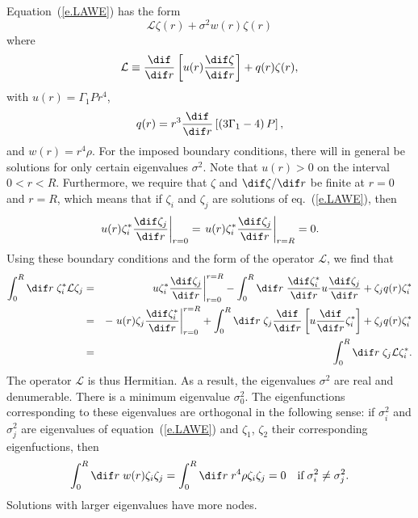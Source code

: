 Equation~(\ref{e.LAWE}) has the form
\[
\mathcal{L}\zeta(r) + \sigma^{2} w(r) \zeta(r)
\]
where
\[
\mathcal{L} \equiv \frac{\dif}{\dif r}\left[ u(r) \frac{\dif \zeta}{\dif r}\right] + q(r)\zeta(r),
\]
with $u(r) = \Gamma_{1} P r^{4}$,
\[ q(r) = r^{3}\frac{\dif}{\dif r}\left[\left( 3\Gamma_{1}-4\right)P\right], \]
and $w(r) = r^{4}\rho$.  For the imposed boundary conditions, there will in general be solutions for only certain eigenvalues $\sigma^{2}$.  Note that $u(r) > 0$ on the interval $0 < r < R$.  Furthermore, we require that $\zeta$ and $\dif \zeta/\dif r$ be finite at $r = 0$ and $r = R$, which means that if $\zeta_{i}$ and $\zeta_{j}$ are solutions of eq.~(\ref{e.LAWE}), then
\begin{equation}\label{e.LAWE-boundary}
\left . u(r) \zeta_{i}^{*}\frac{\dif\zeta_{j}}{\dif r} \right |_{r = 0} = \left . u(r) \zeta_{i}^{*}\frac{\dif\zeta_{j}}{\dif r} \right |_{r = R} = 0.
\end{equation}
Using these boundary conditions and the form of the operator $\mathcal{L}$, we find that
\begin{eqnarray*}
 \int_{0}^{R}\dif r\; \zeta_{i}^{*} \mathcal{L}\zeta_{j} &=&  \left. u\zeta_{i}^{*}\frac{\dif\zeta_{j}}{\dif r}\right|_{r=0}^{r=R} -  \int_{0}^{R}\dif r\; \frac{\dif\zeta_{i}^{*}}{\dif r} u \frac{\dif\zeta_{j}}{\dif r} + \zeta_{j}q(r)\zeta_{i}^{*}\\
  &=& -\left. u(r) \zeta_{j}\frac{\dif\zeta_{i}^{*}}{\dif r} \right|_{r=0}^{r=R} + \int_{0}^{R}\dif r\; \zeta_{j}\frac{\dif}{\dif r}\left[u\frac{\dif}{\dif r}\zeta_{i}^{*}\right] + \zeta_{j}q(r)\zeta_{i}^{*} \\
   &=& \int_{0}^{R}\dif r\; \zeta_{j}\mathcal{L}\zeta_{i}^{*}.
 \end{eqnarray*}
The operator $\mathcal{L}$ is thus Hermitian.  As a result, the eigenvalues $\sigma^{2}$ are real and denumerable.  There is a minimum eigenvalue $\sigma^{2}_{0}$.  The eigenfunctions corresponding to these eigenvalues are orthogonal in the following sense: if $\sigma^{2}_{i}$ and $\sigma_{j}^{2}$ are eigenvalues of equation~(\ref{e.LAWE}) and $\zeta_{1}$, $\zeta_{2}$ their corresponding eigenfuctions, then
\begin{equation}\label{e.LAWE-orthogonality}
\int_{0}^{R}\dif r\; w(r) \zeta_{i}\zeta_{j} = \int_{0}^{R} \dif r\; r^{4}\rho \zeta_{i}\zeta_{j} = 0\quad \textrm{if} \;\sigma_{i}^{2} \neq \sigma_{j}^{2}.
\end{equation}
Solutions with larger eigenvalues have more nodes.

